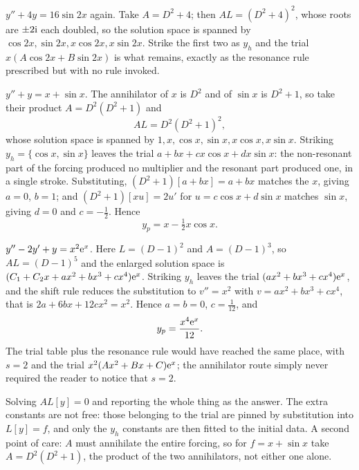 \begin{worked}
$y''+4y=16\sin2x$ again. Take $A=D^{2}+4$; then $AL=(D^{2}+4)^{2}$, whose roots are $\pm2\mathrm{i}$ each doubled, so the solution space is spanned by $\cos2x,\sin2x,x\cos2x,x\sin2x$. Strike the first two as $y_h$ and the trial $x(A\cos2x+B\sin2x)$ is what remains, exactly as the resonance rule prescribed but with no rule invoked.
\end{worked}

\begin{worked}
$y''+y=x+\sin x$. The annihilator of $x$ is $D^{2}$ and of $\sin x$ is $D^{2}+1$, so take their product $A=D^{2}(D^{2}+1)$ and
\[AL=D^{2}(D^{2}+1)^{2},\]
whose solution space is spanned by $1,x,\cos x,\sin x,x\cos x,x\sin x$. Striking $y_h=\{\cos x,\sin x\}$ leaves the trial $a+bx+cx\cos x+dx\sin x$: the non-resonant part of the forcing produced no multiplier and the resonant part produced one, in a single stroke. Substituting, $(D^{2}+1)[a+bx]=a+bx$ matches the $x$, giving $a=0$, $b=1$; and $(D^{2}+1)[xu]=2u'$ for $u=c\cos x+d\sin x$ matches $\sin x$, giving $d=0$ and $c=-\tfrac12$. Hence
\[y_p=x-\tfrac12x\cos x.\]
\end{worked}

\begin{worked}
$y''-2y'+y=x^{2}\mathrm{e}^{x}$. Here $L=(D-1)^{2}$ and $A=(D-1)^{3}$, so $AL=(D-1)^{5}$ and the enlarged solution space is $(C_1+C_2x+ax^{2}+bx^{3}+cx^{4})\mathrm{e}^{x}$. Striking $y_h$ leaves the trial $(ax^{2}+bx^{3}+cx^{4})\mathrm{e}^{x}$, and the shift rule reduces the substitution to $v''=x^{2}$ with $v=ax^{2}+bx^{3}+cx^{4}$, that is $2a+6bx+12cx^{2}=x^{2}$. Hence $a=b=0$, $c=\tfrac{1}{12}$, and
\[y_p=\frac{x^{4}\mathrm{e}^{x}}{12}.\]
The trial table plus the resonance rule would have reached the same place, with $s=2$ and the trial $x^{2}(Ax^{2}+Bx+C)\mathrm{e}^{x}$; the annihilator route simply never required the reader to notice that $s=2$.
\end{worked}

\begin{trap}
Solving $AL[y]=0$ and reporting the whole thing as the answer. The extra constants are not free: those belonging to the trial are pinned by substitution into $L[y]=f$, and only the $y_h$ constants are then fitted to the initial data. A second point of care: $A$ must annihilate the entire forcing, so for $f=x+\sin x$ take $A=D^{2}(D^{2}+1)$, the product of the two annihilators, not either one alone.
\end{trap}

